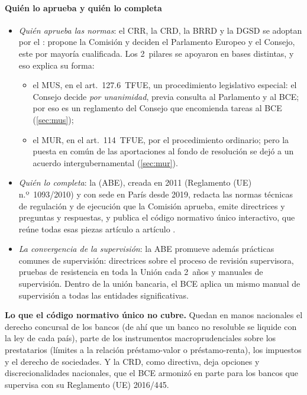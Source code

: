 \documentclass[11pt]{article}
\begin{document}
\paragraph{Quién lo aprueba y quién lo completa}

\begin{itemize}
\item \emph{Quién aprueba las normas}: el CRR, la CRD, la BRRD y la DGSD se adoptan por el : propone la Comisión y deciden el Parlamento Europeo y el Consejo, este por mayoría cualificada. Los 2~pilares se apoyaron en bases distintas, y eso explica su forma:
  \begin{itemize}
  \item el MUS, en el art.~127.6~TFUE, un procedimiento legislativo especial: el Consejo decide \emph{por unanimidad}, previa consulta al Parlamento y al BCE; por eso es un reglamento del Consejo que encomienda tareas al BCE (\ref{sec:mus});
  \item el MUR, en el art.~114~TFUE, por el procedimiento ordinario; pero la puesta en común de las aportaciones al fondo de resolución se dejó a un acuerdo intergubernamental (\ref{sec:mur}).
  \end{itemize}
\item \emph{Quién lo completa}: la  (ABE), creada en 2011 (Reglamento (UE) n.º~1093/2010) y con sede en París desde 2019, redacta las normas técnicas de regulación y de ejecución que la Comisión aprueba, emite directrices y preguntas y respuestas, y publica el código normativo único interactivo, que reúne todas esas piezas artículo a artículo\nocite{ABE2026SingleRulebook} .
\item \emph{La convergencia de la supervisión}: la ABE promueve además prácticas comunes de supervisión: directrices sobre el proceso de revisión supervisora, pruebas de resistencia en toda la Unión cada 2~años y manuales de supervisión. Dentro de la unión bancaria, el BCE aplica un mismo manual de supervisión a todas las entidades significativas.
\end{itemize}

\begin{anotaciones}
\textbf{Lo que el código normativo único no cubre.} Quedan en manos nacionales el derecho concursal de los bancos (de ahí que un banco no resoluble se liquide con la ley de cada país), parte de los instrumentos macroprudenciales sobre los prestatarios (límites a la relación préstamo-valor o préstamo-renta), los impuestos y el derecho de sociedades. Y la CRD, como directiva, deja opciones y discrecionalidades nacionales, que el BCE armonizó en parte para los bancos que supervisa con su Reglamento (UE) 2016/445.
\end{anotaciones}
\end{document}

